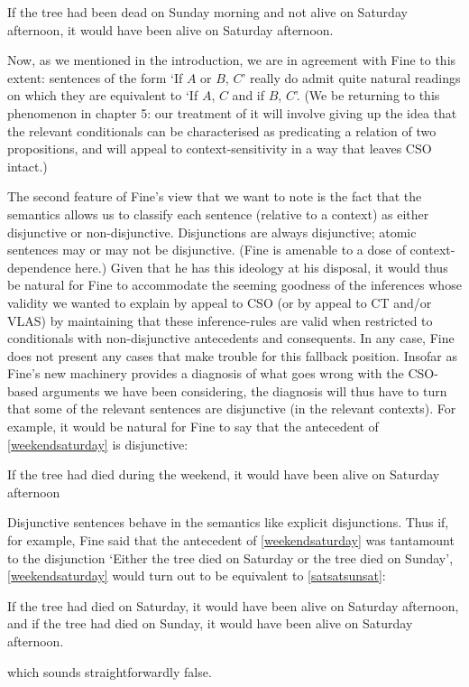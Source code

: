 \documentclass[If.tex]{subfiles}
\begin{document}
\begin{prop}
	\nitem \label{bad}
		If the tree had been dead on Sunday morning and not alive on Saturday afternoon, it would have been alive on Saturday afternoon.
\end{prop}
Now, as we mentioned in the introduction, we are in agreement with Fine to this extent: sentences of the form ‘If $A$ or $B$, $C$’ really do admit quite natural readings on which they are equivalent to ‘If $A$, $C$ and if $B$, $C$’. (We be returning to this phenomenon in chapter 5: our treatment of it will involve giving up the idea that the relevant conditionals can be characterised as predicating a relation of two propositions, and will appeal to context-sensitivity in a way that leaves CSO intact.)


The second feature of Fine's view that we want to note is the fact that the semantics allows us to classify each sentence (relative to a context) as either disjunctive or non-disjunctive. Disjunctions are always disjunctive; atomic sentences may or may not be disjunctive. (Fine is amenable to a dose of context-dependence here.) Given that he has this ideology at his disposal, it would thus be natural for Fine to accommodate the seeming goodness of the inferences whose validity we wanted to explain by appeal to CSO (or by appeal to CT and/or VLAS) by maintaining that these inference-rules are valid when restricted to conditionals with non-disjunctive antecedents and consequents. In any case, Fine does not present any cases that make trouble for this fallback position. Insofar as Fine's new machinery provides a diagnosis of what goes wrong with the CSO-based arguments we have been considering, the diagnosis will thus have to turn that some of the relevant sentences are disjunctive (in the relevant contexts). For example, it would be natural for Fine to say that the antecedent of \ref{weekendsaturday} is disjunctive:
\begin{prop}
	\nitem \label{weekendsaturday}
		If the tree had died during the weekend, it would have been alive on Saturday afternoon
\end{prop}
Disjunctive sentences behave in the semantics like explicit disjunctions. Thus if, for example, Fine said that the antecedent of \ref{weekendsaturday} was tantamount to the disjunction ‘Either the tree died on Saturday or the tree died on Sunday’, \ref{weekendsaturday} would turn out to be equivalent to \ref{satsatsunsat}:
\begin{prop}
	\nitem \label{satsatsunsat}
		If the tree had died on Saturday, it would have been alive on Saturday afternoon, and if the tree had died on Sunday, it would have been alive on Saturday afternoon.
\end{prop}
which sounds straightforwardly false.
\end{document}
